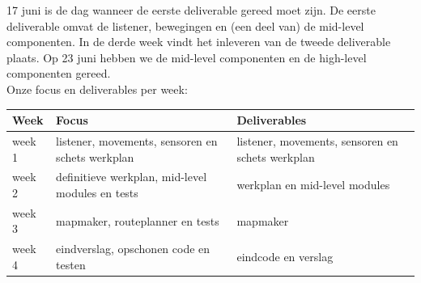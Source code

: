 \documentclass[a4paper,10pt]{article}
\begin{document}
17 juni is de dag wanneer de eerste deliverable gereed moet zijn. De eerste deliverable omvat de listener, bewegingen en (een deel van) de mid-level componenten. In de derde week vindt het inleveren van de tweede deliverable plaats. Op 23 juni hebben we de mid-level componenten en de high-level componenten gereed.\\
Onze focus en deliverables per week:\\
\begin{tabular}{|l|p{5cm}|p{5cm}|}
\hline
Week&Focus&Deliverables\\
\hline
week 1&listener, movements, sensoren en schets werkplan& listener, movements, sensoren en schets werkplan \\ 
\hline
week 2&definitieve werkplan, mid-level modules en tests& werkplan en mid-level modules\\
\hline
week 3&mapmaker, routeplanner en tests & mapmaker\\
\hline
week 4& eindverslag, opschonen code en testen& eindcode en verslag\\
\hline

\end{tabular}
\end{document}
